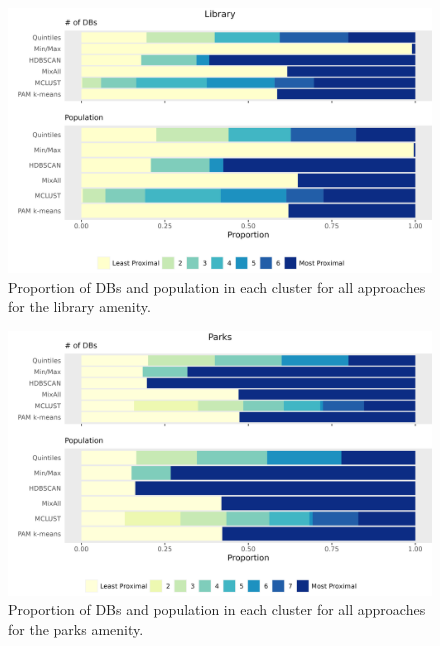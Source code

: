\documentclass[11pt, a4paper]{article}
\begin{document}
\begin{figure}[H]
\centering
\includegraphics[width=\textwidth]{./barplot_comparison/Library_barplot.png}
\caption[Library profile barplot]{Proportion of DBs and population in each cluster for all approaches for the library amenity.}\label{librarybarplot}
\end{figure}









\begin{figure}[H]
\centering
\includegraphics[width=\textwidth]{./barplot_comparison/Parks_barplot.png}
\caption[Parks profile barplot]{Proportion of DBs and population in each cluster for all approaches for the parks amenity.}\label{parksbarplot}
\end{figure}
\end{document}
